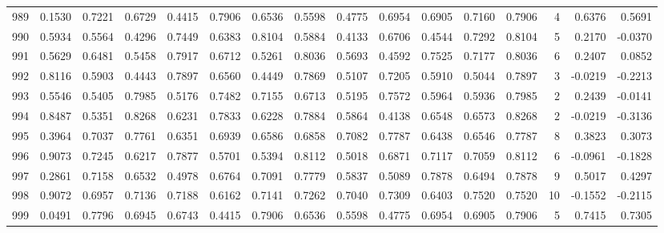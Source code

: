 \begin{tabular}{lrrrrrrrrrrrrrrr}
989 &      0.1530 &  0.7221 &  0.6729 &  0.4415 &  0.7906 &  0.6536 &  0.5598 &  0.4775 &  0.6954 &  0.6905 &   0.7160 &     0.7906 &      4 &                    0.6376 &                     0.5691 \\
990 &      0.5934 &  0.5564 &  0.4296 &  0.7449 &  0.6383 &  0.8104 &  0.5884 &  0.4133 &  0.6706 &  0.4544 &   0.7292 &     0.8104 &      5 &                    0.2170 &                    -0.0370 \\
991 &      0.5629 &  0.6481 &  0.5458 &  0.7917 &  0.6712 &  0.5261 &  0.8036 &  0.5693 &  0.4592 &  0.7525 &   0.7177 &     0.8036 &      6 &                    0.2407 &                     0.0852 \\
992 &      0.8116 &  0.5903 &  0.4443 &  0.7897 &  0.6560 &  0.4449 &  0.7869 &  0.5107 &  0.7205 &  0.5910 &   0.5044 &     0.7897 &      3 &                   -0.0219 &                    -0.2213 \\
993 &      0.5546 &  0.5405 &  0.7985 &  0.5176 &  0.7482 &  0.7155 &  0.6713 &  0.5195 &  0.7572 &  0.5964 &   0.5936 &     0.7985 &      2 &                    0.2439 &                    -0.0141 \\
994 &      0.8487 &  0.5351 &  0.8268 &  0.6231 &  0.7833 &  0.6228 &  0.7884 &  0.5864 &  0.4138 &  0.6548 &   0.6573 &     0.8268 &      2 &                   -0.0219 &                    -0.3136 \\
995 &      0.3964 &  0.7037 &  0.7761 &  0.6351 &  0.6939 &  0.6586 &  0.6858 &  0.7082 &  0.7787 &  0.6438 &   0.6546 &     0.7787 &      8 &                    0.3823 &                     0.3073 \\
996 &      0.9073 &  0.7245 &  0.6217 &  0.7877 &  0.5701 &  0.5394 &  0.8112 &  0.5018 &  0.6871 &  0.7117 &   0.7059 &     0.8112 &      6 &                   -0.0961 &                    -0.1828 \\
997 &      0.2861 &  0.7158 &  0.6532 &  0.4978 &  0.6764 &  0.7091 &  0.7779 &  0.5837 &  0.5089 &  0.7878 &   0.6494 &     0.7878 &      9 &                    0.5017 &                     0.4297 \\
998 &      0.9072 &  0.6957 &  0.7136 &  0.7188 &  0.6162 &  0.7141 &  0.7262 &  0.7040 &  0.7309 &  0.6403 &   0.7520 &     0.7520 &     10 &                   -0.1552 &                    -0.2115 \\
999 &      0.0491 &  0.7796 &  0.6945 &  0.6743 &  0.4415 &  0.7906 &  0.6536 &  0.5598 &  0.4775 &  0.6954 &   0.6905 &     0.7906 &      5 &                    0.7415 &                     0.7305 \\
\bottomrule
\end{tabular}
